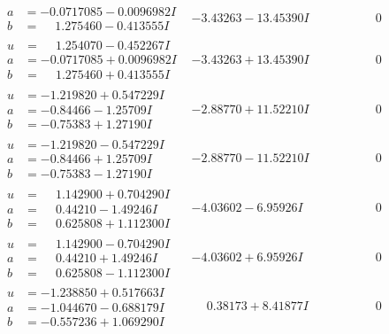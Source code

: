 \documentclass[1p]{elsarticle_modified}
\theoremstyle{definition}
\begin{document}
$$\begin{array}{c|c|c}
\begin{aligned}
a &= -0.0717085 - 0.0096982 I \\
b &= \phantom{-}1.275460 - 0.413555 I\end{aligned}
 & -3.43263 - 13.45390 I & \phantom{-0.000000 } 0 \\ \hline\begin{aligned}
u &= \phantom{-}1.254070 - 0.452267 I \\
a &= -0.0717085 + 0.0096982 I \\
b &= \phantom{-}1.275460 + 0.413555 I\end{aligned}
 & -3.43263 + 13.45390 I & \phantom{-0.000000 } 0 \\ \hline\begin{aligned}
u &= -1.219820 + 0.547229 I \\
a &= -0.84466 - 1.25709 I \\
b &= -0.75383 + 1.27190 I\end{aligned}
 & -2.88770 + 11.52210 I & \phantom{-0.000000 } 0 \\ \hline\begin{aligned}
u &= -1.219820 - 0.547229 I \\
a &= -0.84466 + 1.25709 I \\
b &= -0.75383 - 1.27190 I\end{aligned}
 & -2.88770 - 11.52210 I & \phantom{-0.000000 } 0 \\ \hline\begin{aligned}
u &= \phantom{-}1.142900 + 0.704290 I \\
a &= \phantom{-}0.44210 - 1.49246 I \\
b &= \phantom{-}0.625808 + 1.112300 I\end{aligned}
 & -4.03602 - 6.95926 I & \phantom{-0.000000 } 0 \\ \hline\begin{aligned}
u &= \phantom{-}1.142900 - 0.704290 I \\
a &= \phantom{-}0.44210 + 1.49246 I \\
b &= \phantom{-}0.625808 - 1.112300 I\end{aligned}
 & -4.03602 + 6.95926 I & \phantom{-0.000000 } 0 \\ \hline\begin{aligned}
u &= -1.238850 + 0.517663 I \\
a &= -1.044670 - 0.688179 I \\
b &= -0.557236 + 1.069290 I\end{aligned}
 & \phantom{-}0.38173 + 8.41877 I & \phantom{-0.000000 } 0 \\ \hline\begin{aligned}

\end{aligned}
\end{array}$$
\end{document}
